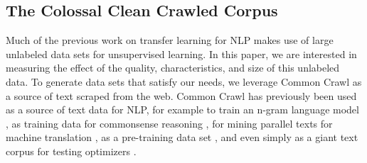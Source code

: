 \documentclass[twoside,11pt]{article}
\begin{document}
\subsection{The Colossal Clean Crawled Corpus}
\label{sec:dataset}

Much of the previous work on transfer learning for NLP makes use of large unlabeled data sets for unsupervised learning.
In this paper, we are interested in measuring the effect of the quality, characteristics, and size of this unlabeled data.
To generate data sets that satisfy our needs, we leverage Common Crawl as a source of text scraped from the web.
Common Crawl has previously been used as a source of text data for NLP, for example to train an n-gram language model \citep{buck2014n}, as training data for commonsense reasoning \citep{trinh2018simple}, for mining parallel texts for machine translation \citep{smith2013dirt}, as a pre-training data set \citep{grave2018learning,zellers2019defending,liu2019roberta}, and even simply as a giant text corpus for testing optimizers \citep{anil2019memory}.
\end{document}
